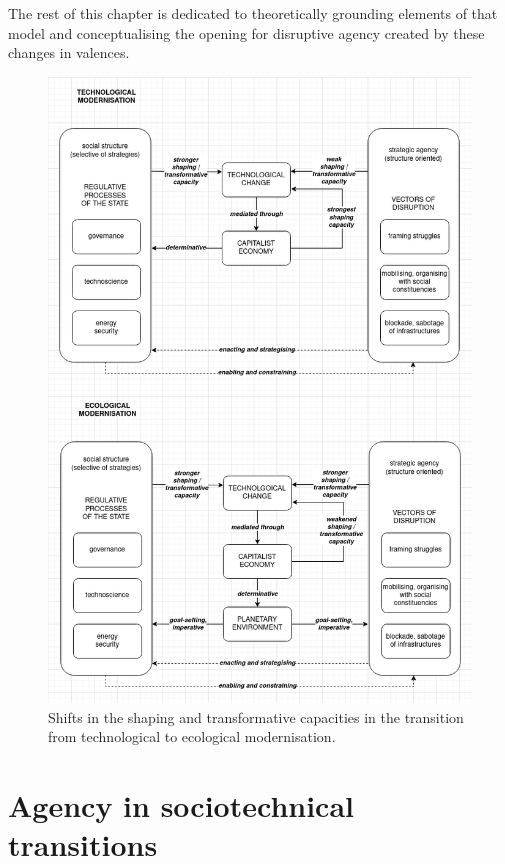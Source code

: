 \documentclass[a4paper, nobind]{templates/ociamthesis}
\begin{document}
The rest of this chapter is dedicated to theoretically grounding elements of that model and conceptualising the opening for disruptive agency created by these changes in valences.

\begin{figure}
\includegraphics[width=1\linewidth]{./figures/technology_structure_agency_modernisation} \caption[Technological vs ecological modernisation]{Shifts in the shaping and transformative capacities in the transition from technological to ecological modernisation.}\label{fig:unnamed-chunk-3}
\end{figure}

\hypertarget{agency-in-sociotechnical-transitions}{%
\section{Agency in sociotechnical transitions}\label{agency-in-sociotechnical-transitions}}
\end{document}
